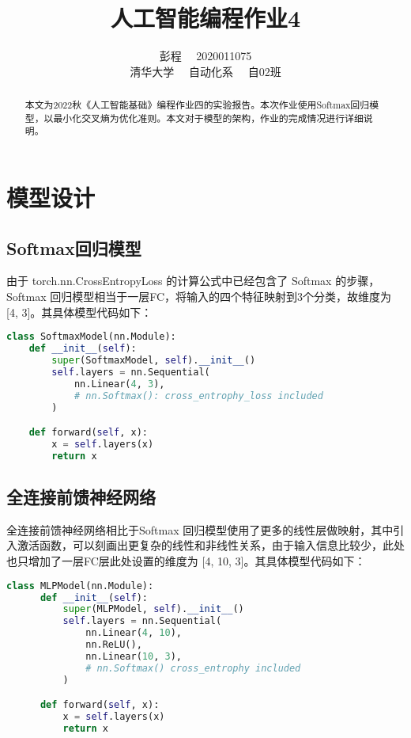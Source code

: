 \documentclass[lang=cn,a4paper]{elegantpaper}
\title{人工智能编程作业4}
\author{彭程~~ 2020011075 \\ 清华大学~~ 自动化系~~ 自02班}
\date{\zhtoday}
\begin{document}
\maketitle

\begin{abstract}
本文为2022秋《人工智能基础》编程作业四的实验报告。本次作业使用Softmax回归模型，以最小化交叉熵为优化准则。本文对于模型的架构，作业的完成情况进行详细说明。
\end{abstract}

\section{模型设计}

\subsection{Softmax回归模型}\label{intro}

由于 torch.nn.CrossEntropyLoss 的计算公式中已经包含了 Softmax 的步骤， Softmax 回归模型相当于一层FC，将输入的四个特征映射到3个分类，故维度为 [4, 3]。其具体模型代码如下：

\begin{lstlisting}[language = python]
  class SoftmaxModel(nn.Module):
    def __init__(self):
        super(SoftmaxModel, self).__init__()
        self.layers = nn.Sequential(
            nn.Linear(4, 3),
            # nn.Softmax(): cross_entrophy_loss included
        )

    def forward(self, x):
        x = self.layers(x)
        return x
\end{lstlisting}


\subsection{全连接前馈神经网络}\label{intro}

全连接前馈神经网络相比于Softmax 回归模型使用了更多的线性层做映射，其中引入激活函数，可以刻画出更复杂的线性和非线性关系，由于输入信息比较少，此处也只增加了一层FC层此处设置的维度为 [4, 10, 3]。其具体模型代码如下：

\begin{lstlisting}[language = python]
  class MLPModel(nn.Module):
      def __init__(self):
          super(MLPModel, self).__init__()
          self.layers = nn.Sequential(
              nn.Linear(4, 10),
              nn.ReLU(),
              nn.Linear(10, 3),
              # nn.Softmax() cross_entrophy included
          )

      def forward(self, x):
          x = self.layers(x)
          return x
\end{lstlisting}
\end{document}
